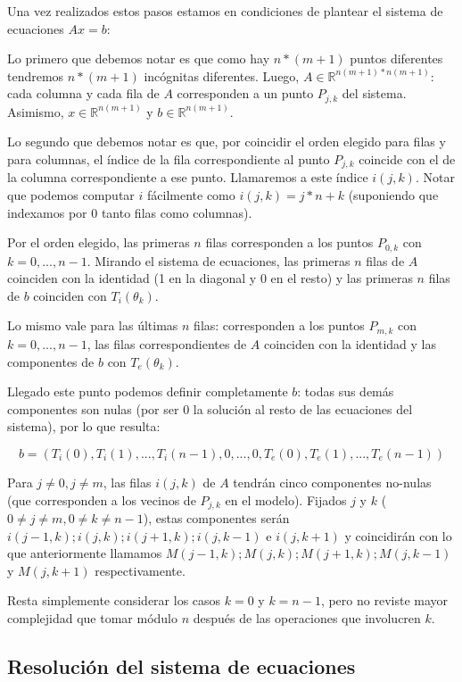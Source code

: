 Una vez realizados estos pasos estamos en condiciones de plantear el sistema de ecuaciones $Ax=b$:

Lo primero que debemos notar es que como hay $n*(m+1)$ puntos diferentes tendremos $n*(m+1)$ incógnitas diferentes. Luego, $A \in \mathbb{R}^{n(m+1)*n(m+1)}$: cada columna y cada fila de $A$ corresponden a un punto $P_{j,k}$ del sistema. Asimismo, $x \in \mathbb{R}^{n(m+1)}$ y $b \in \mathbb{R}^{n(m+1)}$. 

Lo segundo que debemos notar es que, por coincidir el orden elegido para filas y para columnas, el índice de la fila correspondiente al punto $P_{j,k}$ coincide con el de la columna correspondiente a ese punto. Llamaremos a este índice $i(j,k)$. Notar que podemos computar $i$ fácilmente como $i(j,k)=j*n+k$ (suponiendo que indexamos por 0 tanto filas como columnas).

Por el orden elegido, las primeras $n$ filas corresponden a los puntos $P_{0,k}$ con $k=0,...,n-1$. Mirando el sistema de ecuaciones, las primeras $n$ filas de $A$ coinciden con la identidad (1 en la diagonal y 0 en el resto) y las primeras $n$ filas de $b$ coinciden con $T_i(\theta_k)$.

Lo mismo vale para las últimas $n$ filas: corresponden a los puntos $P_{m,k}$ con $k=0,...,n-1$, las filas correspondientes de $A$ coinciden con la identidad y las componentes de $b$ con $T_e(\theta_k)$.

Llegado este punto podemos definir completamente $b$: todas sus demás componentes son nulas (por ser $0$ la solución al resto de las ecuaciones del sistema), por lo que resulta:

$$b = (T_i(0), T_i(1), ..., T_i(n-1), 0, ..., 0, T_e(0), T_e(1), ..., T_e(n-1)) $$

Para $j \not = 0, j \not = m$, las filas $i(j,k)$ de $A$ tendrán cinco componentes no-nulas (que corresponden a los vecinos de $P_{j,k}$ en el modelo). Fijados $j$ y $k$ ($0\not=j\not=m, 0\not=k\not=n-1$), estas componentes serán $i(j-1,k); i(j,k); i(j+1,k); i(j,k-1)$ e $i(j,k+1)$ y coincidirán con lo que anteriormente llamamos $M(j-1,k); M(j,k); M(j+1,k); M(j,k-1)$ y $M(j,k+1)$ respectivamente. 

Resta simplemente considerar los casos $k=0$ y $k=n-1$, pero no reviste mayor complejidad que tomar módulo $n$ después de las operaciones que involucren $k$.

\subsection{Resolución del sistema de ecuaciones}

